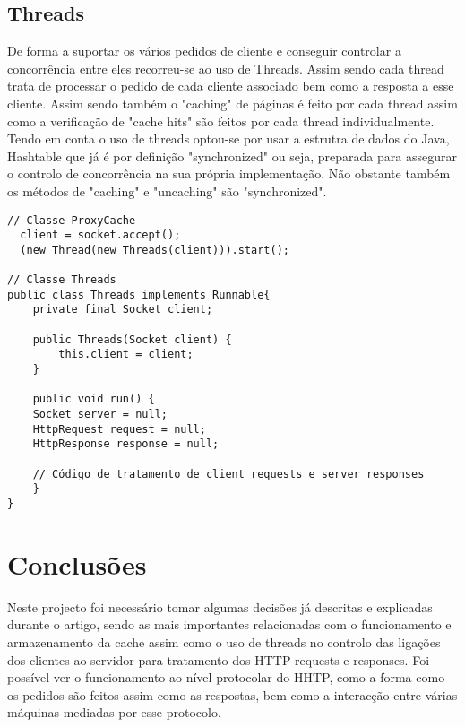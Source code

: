 \documentclass{llncs}
\begin{document}
\subsection{Threads}
De forma a suportar os vários pedidos de cliente e conseguir controlar a 
concorrência entre eles recorreu-se ao uso de Threads. Assim sendo cada thread 
trata de processar o pedido de cada cliente associado bem como a resposta a esse 
cliente. Assim sendo também o "caching" de páginas é feito por cada thread assim 
como a verificação de "cache hits" são feitos por cada thread individualmente. 
Tendo em conta o uso de threads optou-se por usar a estrutra de dados do Java, 
Hashtable que já é por definição "synchronized" ou seja, preparada para 
assegurar o controlo de concorrência na sua própria implementação. Não obstante 
também os métodos de "caching" e "uncaching" são "synchronized". 
\begin{verbatim}
// Classe ProxyCache
  client = socket.accept();
  (new Thread(new Threads(client))).start(); 
  
// Classe Threads
public class Threads implements Runnable{
	private final Socket client;

    public Threads(Socket client) {
        this.client = client;
    }	
    
    public void run() {
	Socket server = null;
	HttpRequest request = null;
	HttpResponse response = null;
    
    // Código de tratamento de client requests e server responses
    }
}
  \end{verbatim}



\section{Conclusões}
Neste projecto foi necessário tomar algumas decisões já descritas e explicadas 
durante o artigo, sendo as mais importantes relacionadas com o funcionamento e 
armazenamento da cache assim como o uso de threads no controlo das ligações dos 
clientes ao servidor para tratamento dos HTTP requests e responses. Foi possível 
ver o funcionamento ao nível protocolar do HHTP, como a forma como os pedidos 
são feitos assim como as respostas, bem como a interacção entre várias máquinas 
mediadas por esse protocolo.
\end{document}
